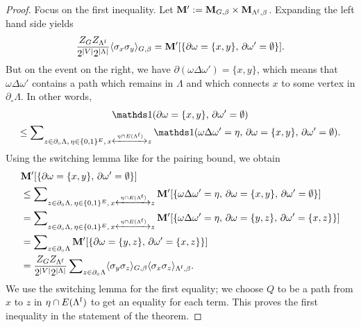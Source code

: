 \begin{proof}
    Focus on the first inequality.
    Let $\mathbf{M}':=\mathbf{M}_{G,\beta}\times\mathbf{M}_{\Lambda^{\operatorname{f}},\beta}$.
    Expanding the left hand side yields
    \[
        \frac{Z_GZ_{\Lambda^{\operatorname{f}}}}{2^{|V|}2^{|\Lambda|}}
        \langle\sigma_x\sigma_y\rangle_{G,\beta}
        =
        \mathbf{M}'[\{\partial\omega=\{x,y\},\,\partial\omega'=\emptyset\}].
    \]
    But on the event on the right,
    we have $\partial(\omega\Delta\omega')=\{x,y\}$,
    which means that $\omega\Delta\omega'$ contains a path
    which remains in $\Lambda$
    and which connects $x$ to some vertex in $\partial_\circ\Lambda$.
    In other words,
    \begin{multline}
        \label{eq:converse}
        \true{\partial\omega=\{x,y\},\,\partial\omega'=\emptyset}
        \\
        \leq
        \sum\nolimits_{z\in\partial_\circ\Lambda,\,\eta\in\{0,1\}^E,\,x\xleftrightarrow{\eta\cap
        E(\Lambda^\f)}z}
        \true{\omega\Delta\omega'=\eta,\,\partial\omega=\{x,y\},\,\partial\omega'=\emptyset}.
    \end{multline}
    Using the switching lemma like for the pairing bound,
    we obtain
    \begin{align}
        &\mathbf{M}'[\{\partial\omega=\{x,y\},\,\partial\omega'=\emptyset\}]
        \\&
        \leq
        \sum\nolimits_{z\in\partial_\circ\Lambda,\,\eta\in\{0,1\}^E,\,x\xleftrightarrow{\eta\cap
        E(\Lambda^{\operatorname{f}})}z}
        \mathbf{M}'[
        \{\omega\Delta\omega'=\eta,\,\partial\omega=\{x,y\},\,\partial\omega'=\emptyset\}]
        \\&
        =
        \sum\nolimits_{z\in\partial_\circ\Lambda,\,\eta\in\{0,1\}^E,\,x\xleftrightarrow{\eta\cap
        E(\Lambda^{\operatorname{f}})}z}
        \mathbf{M}'[
        \{\omega\Delta\omega'=\eta,\,\partial\omega=\{y,z\},\,\partial\omega'=\{x,z\}\}]
        \\&
        =
        \sum\nolimits_{z\in\partial_\circ\Lambda}
        \mathbf{M}'[
        \{\partial\omega=\{y,z\},\,\partial\omega'=\{x,z\}\}]
        \\&=
        \frac{Z_GZ_{\Lambda^{\operatorname{f}}}}{2^{|V|}2^{|\Lambda|}}
        \sum\nolimits_{z\in\partial_\circ\Lambda}
        \langle\sigma_y\sigma_z\rangle_{G,\beta}
        \langle\sigma_x\sigma_z\rangle_{\Lambda^{\operatorname{f}},\beta}.
    \end{align}
    We use the switching lemma for the first equality;
    we choose $Q$ to be a path from $x$ to $z$ in $\eta\cap E(\Lambda^{\operatorname{f}})$
    to get an equality for each term.
    This proves the first inequality in the statement of the theorem.


\end{proof}
